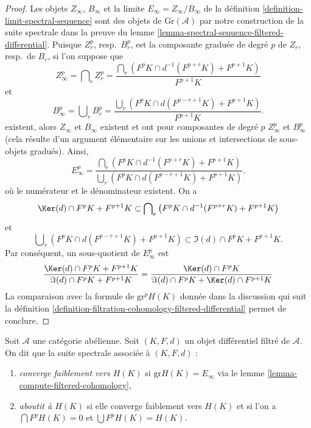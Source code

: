 \begin{proof}
Les objets $Z_\infty$, $B_\infty$ et la limite
$E_\infty = Z_\infty/B_\infty$ de la
définition \ref{definition-limit-spectral-sequence}
sont des objets de $\text{Gr}(\mathcal{A})$ par notre construction de
la suite spectrale dans la preuve du
lemme \ref{lemma-spectral-sequence-filtered-differential}.
Puisque $Z_r^p$, resp.\ $B_r^p$, est la composante graduée de degré $p$ de $Z_r$,
resp.\ de $B_r$, si l'on suppose que
$$
Z_\infty^p = \bigcap\nolimits_r Z_r^p =
\frac{\bigcap_r (F^pK \cap d^{-1}(F^{p + r}K) + F^{p + 1}K)}{F^{p + 1}K}
$$
et
$$
B_\infty^p = \bigcup\nolimits_r B_r^p =
\frac{\bigcup_r (F^pK \cap d(F^{p - r + 1}K) + F^{p + 1}K)}{F^{p + 1}K}.
$$
existent, alors $Z_\infty$ et $B_\infty$ existent et ont pour composantes de degré $p$
$Z_\infty^p$ et $B_\infty^p$ (cela résulte d'un argument élémentaire
sur les unions et intersections de sous-objets gradués). Ainsi,
$$
E_\infty^p =
\frac{\bigcap_r (F^pK \cap d^{-1}(F^{p + r}K) + F^{p + 1}K)}
{\bigcup_r (F^pK \cap d(F^{p - r + 1}K) + F^{p + 1}K)}.
$$
où le numérateur et le dénominateur existent. On a
\begin{equation}
\label{equation-on-top}
\Ker(d) \cap F^pK + F^{p + 1}K
\subset
\bigcap\nolimits_r \left(F^pK \cap d^{-1}(F^{p + r}K) + F^{p + 1}K\right)
\end{equation}
et
\begin{equation}
\label{equation-at-bottom}
\bigcup\nolimits_r \left(F^pK \cap d(F^{p - r + 1}K) + F^{p + 1}K\right)
\subset
\Im(d) \cap F^pK + F^{p + 1}K.
\end{equation}
Par conséquent, un sous-quotient de $E_\infty^p$ est
$$
\frac{\Ker(d) \cap F^pK + F^{p + 1}K}{\Im(d) \cap F^pK + F^{p + 1}K} =
\frac{\Ker(d) \cap F^pK}{\Im(d) \cap F^pK + \Ker(d) \cap F^{p + 1}K}
$$
La comparaison avec la formule de $\text{gr}^pH(K)$ donnée dans la discussion
qui suit la
définition \ref{definition-filtration-cohomology-filtered-differential}
permet de conclure.
\end{proof}

\begin{definition}
\label{definition-filtered-differential-ss-converges}
Soit $\mathcal{A}$ une catégorie abélienne.
Soit $(K, F, d)$ un objet différentiel filtré de $\mathcal{A}$.
On dit que la suite spectrale associée à $(K, F, d)$ :
\begin{enumerate}
\item {\it converge faiblement vers $H(K)$} si $\text{gr}H(K) = E_{\infty}$
via le lemme \ref{lemma-compute-filtered-cohomology},
\item {\it aboutit à $H(K)$} si elle converge faiblement vers $H(K)$ et si
l'on a $\bigcap F^pH(K) = 0$ et $\bigcup F^pH(K) = H(K)$.
\end{enumerate}
\end{definition}

